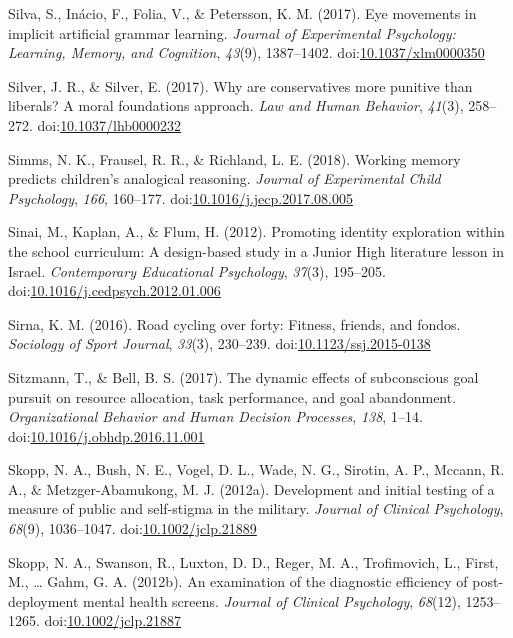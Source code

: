 \documentclass[english,man]{apa6}
\begin{document}
\hypertarget{ref-Silva2017}{}
Silva, S., Inácio, F., Folia, V., \& Petersson, K. M. (2017). Eye
movements in implicit artificial grammar learning. \emph{Journal of
Experimental Psychology: Learning, Memory, and Cognition}, \emph{43}(9),
1387--1402.
doi:\href{https://doi.org/10.1037/xlm0000350}{10.1037/xlm0000350}

\hypertarget{ref-Silver2017}{}
Silver, J. R., \& Silver, E. (2017). Why are conservatives more punitive
than liberals? A moral foundations approach. \emph{Law and Human
Behavior}, \emph{41}(3), 258--272.
doi:\href{https://doi.org/10.1037/lhb0000232}{10.1037/lhb0000232}

\hypertarget{ref-Simms2018}{}
Simms, N. K., Frausel, R. R., \& Richland, L. E. (2018). Working memory
predicts children's analogical reasoning. \emph{Journal of Experimental
Child Psychology}, \emph{166}, 160--177.
doi:\href{https://doi.org/10.1016/j.jecp.2017.08.005}{10.1016/j.jecp.2017.08.005}

\hypertarget{ref-Sinai2012}{}
Sinai, M., Kaplan, A., \& Flum, H. (2012). Promoting identity
exploration within the school curriculum: A design-based study in a
Junior High literature lesson in Israel. \emph{Contemporary Educational
Psychology}, \emph{37}(3), 195--205.
doi:\href{https://doi.org/10.1016/j.cedpsych.2012.01.006}{10.1016/j.cedpsych.2012.01.006}

\hypertarget{ref-Sirna2016}{}
Sirna, K. M. (2016). Road cycling over forty: Fitness, friends, and
fondos. \emph{Sociology of Sport Journal}, \emph{33}(3), 230--239.
doi:\href{https://doi.org/10.1123/ssj.2015-0138}{10.1123/ssj.2015-0138}

\hypertarget{ref-Sitzmann2017}{}
Sitzmann, T., \& Bell, B. S. (2017). The dynamic effects of subconscious
goal pursuit on resource allocation, task performance, and goal
abandonment. \emph{Organizational Behavior and Human Decision
Processes}, \emph{138}, 1--14.
doi:\href{https://doi.org/10.1016/j.obhdp.2016.11.001}{10.1016/j.obhdp.2016.11.001}

\hypertarget{ref-Skopp2012a}{}
Skopp, N. A., Bush, N. E., Vogel, D. L., Wade, N. G., Sirotin, A. P.,
Mccann, R. A., \& Metzger-Abamukong, M. J. (2012a). Development and
initial testing of a measure of public and self-stigma in the military.
\emph{Journal of Clinical Psychology}, \emph{68}(9), 1036--1047.
doi:\href{https://doi.org/10.1002/jclp.21889}{10.1002/jclp.21889}

\hypertarget{ref-Skopp2012}{}
Skopp, N. A., Swanson, R., Luxton, D. D., Reger, M. A., Trofimovich, L.,
First, M., \ldots{} Gahm, G. A. (2012b). An examination of the
diagnostic efficiency of post-deployment mental health screens.
\emph{Journal of Clinical Psychology}, \emph{68}(12), 1253--1265.
doi:\href{https://doi.org/10.1002/jclp.21887}{10.1002/jclp.21887}
\end{document}
